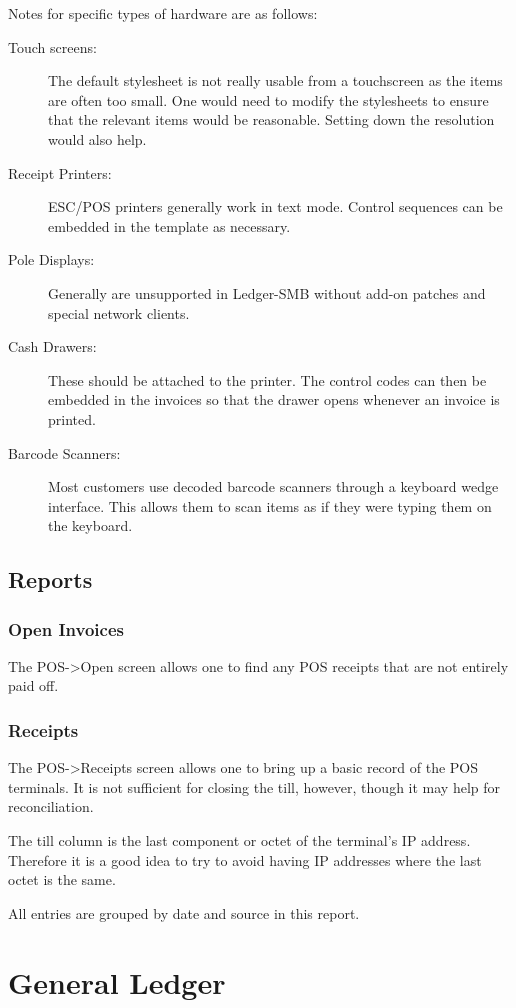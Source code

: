 \documentclass{article}
\begin{document}
Notes for specific types of hardware are as follows:

\begin{description}
\item[Touch screens:]  The default stylesheet is not really usable from a
touchscreen as the items are often too small.  One would need to modify the
stylesheets to ensure that the relevant items would be reasonable.  Setting down
the resolution would also help.
\item[Receipt Printers:] ESC/POS printers generally work in text mode.  Control
sequences can be embedded in the template as necessary.
\item[Pole Displays:]  Generally are unsupported in Ledger-SMB without add-on
patches and special network clients.
\item[Cash Drawers:] These should be attached to the printer.  The control codes
can then be embedded in the invoices so that the drawer opens whenever an
invoice is printed.
\item[Barcode Scanners:]  Most customers use decoded barcode scanners through a
keyboard wedge interface.  This allows them to scan items as if they were typing
them on the keyboard.
\end{description}

\subsection{Reports}
\subsubsection{Open Invoices}
The POS-\textgreater Open screen allows one to find any POS receipts that are
not entirely paid off.

\subsubsection{Receipts}
The POS-\textgreater Receipts screen allows one to bring up a basic record of
the POS terminals.   It is not sufficient for closing the till, however, though
it may help for reconciliation.

The till column is the last component or octet of the terminal's IP address.
Therefore it is a good idea to try to avoid having IP addresses where the last
octet is the same.

All entries are grouped by date and source in this report.

\section{General Ledger}
\end{document}
